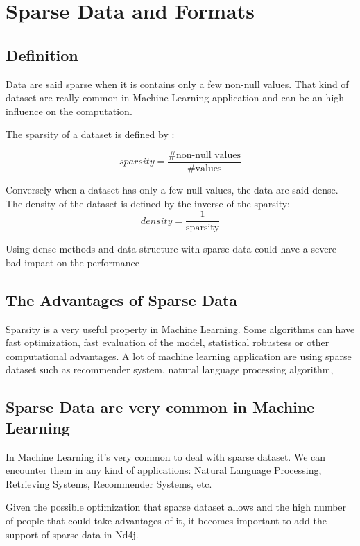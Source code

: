 \chapter{Sparse Data and Formats}
\section{Definition}

Data are said sparse when it is contains only a few non-null values. That kind of dataset are really common in Machine Learning application and can be an high influence on the computation. 

The sparsity of a dataset is defined by :

\begin{equation}\label{eqn:sparsity}
sparsity = \frac{\text{\# non-null values}}{\text{\# values}}
\end{equation}

Conversely when a dataset has only a few null values, the data are said dense. The density of the dataset is defined by the inverse of the sparsity:
\begin{equation}\label{eqn:density}
density = \frac{1}{\text{sparsity}}
\end{equation}

Using dense methods and data structure with sparse data could have a severe bad impact on the performance
\section{The Advantages of Sparse Data}
Sparsity is a very useful property in Machine Learning. Some algorithms can have fast optimization, fast evaluation of the model, statistical robustess or other computational advantages.
A lot of machine learning application are using sparse dataset such as recommender system, natural language processing algorithm, 

\section{Sparse Data are very common in Machine Learning}

In Machine Learning it's very common to deal with sparse dataset. We can encounter them in any kind of applications: Natural Language Processing, Retrieving Systems, Recommender Systems, etc.

Given the possible optimization that sparse dataset allows and the high number of people that could take advantages of it, it becomes important to add the support of sparse data in Nd4j. 
